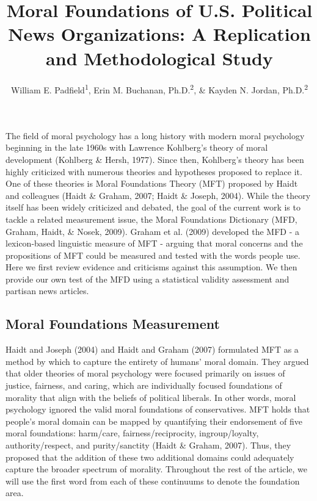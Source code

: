 \documentclass[
  man,floatsintext]{apa6}
\title{Moral Foundations of U.S. Political News Organizations: A Replication and Methodological Study}
\author{William E. Padfield\textsuperscript{1}, Erin M. Buchanan, Ph.D.\textsuperscript{2}, \& Kayden N. Jordan, Ph.D.\textsuperscript{2}}
\date{}
\affiliation{\vspace{0.5cm}\textsuperscript{1} Missouri State University\\\textsuperscript{2} Harrisburg University of Science and Technology}
\begin{document}
\maketitle

The field of moral psychology has a long history with modern moral
psychology beginning in the late 1960s with Lawrence Kohlberg's theory
of moral development (Kohlberg \& Hersh, 1977). Since then, Kohlberg's theory has
been highly criticized with numerous theories and hypotheses proposed to
replace it. One of these theories is Moral Foundations Theory (MFT)
proposed by Haidt and colleagues (Haidt \& Graham, 2007; Haidt \& Joseph, 2004). While the
theory itself has been widely criticized and debated, the goal of the
current work is to tackle a related measurement issue, the Moral
Foundations Dictionary (MFD, Graham, Haidt, \& Nosek, 2009). Graham et al. (2009) developed the
MFD - a lexicon-based linguistic measure of MFT - arguing that moral
concerns and the propositions of MFT could be measured and tested with
the words people use. Here we first review evidence and criticisms
against this assumption. We then provide our own test of the MFD using a statistical validity assessment and partisan news articles.

\subsection{Moral Foundations Measurement}\label{moral-foundations-measurement}

Haidt and Joseph (2004) and Haidt and Graham (2007)
formulated MFT as a method by which to capture the entirety of humans'
moral domain. They argued that older theories of moral psychology were
focused primarily on issues of justice, fairness, and caring, which are
individually focused foundations of morality that align with the beliefs
of political liberals. In other words, moral psychology ignored the
valid moral foundations of conservatives. MFT holds that people's moral
domain can be mapped by quantifying their endorsement of five moral
foundations: harm/care, fairness/reciprocity, ingroup/loyalty,
authority/respect, and purity/sanctity (Haidt \& Graham, 2007). Thus, they
proposed that the addition of these two additional domains could
adequately capture the broader spectrum of morality. Throughout the rest of the article, we will use the first word from each of these continuums to denote the foundation area.
\end{document}
